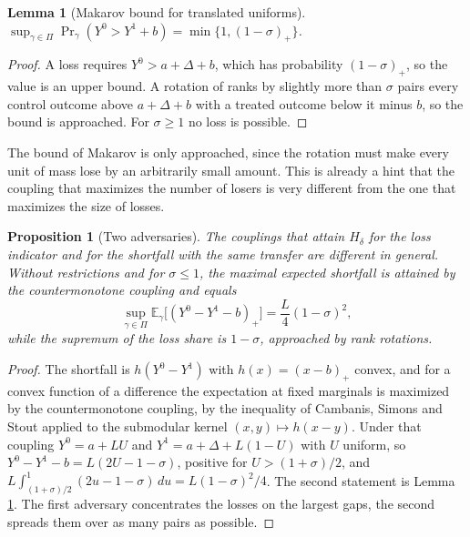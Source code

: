 \documentclass[11pt,a4paper]{article}
\theoremstyle{notesplain}
\newtheorem{proposition}[theorem]{Proposition}
\newtheorem{lemma}[theorem]{Lemma}
\theoremstyle{notesupright}
\numberwithin{equation}{section}
\newcommand{\E}{\mathbb{E}}
\begin{document}
\begin{lemma}[Makarov bound for translated uniforms]
\label{lem:makarov}
$\sup_{\gamma\in\Pi}\Pr_\gamma(Y^0>Y^1+b)=\min\{1,(1-\sigma)_+\}$.
\end{lemma}

\begin{proof}
A loss requires $Y^0>a+\Delta+b$, which has probability $(1-\sigma)_+$, so the value is an upper bound. A rotation of ranks by slightly more than $\sigma$ pairs every control outcome above $a+\Delta+b$ with a treated outcome below it minus $b$, so the bound is approached. For $\sigma\ge1$ no loss is possible.
\end{proof}

The bound of Makarov \cite{makarov} is only approached, since the rotation must make every unit of mass lose by an arbitrarily small amount. This is already a hint that the coupling that maximizes the number of losers is very different from the one that maximizes the size of losses.

\begin{proposition}[Two adversaries]
\label{prop:adversaries}
The couplings that attain $H_\delta$ for the loss indicator and for the shortfall with the same transfer are different in general. Without restrictions and for $\sigma\le1$, the maximal expected shortfall is attained by the countermonotone coupling and equals
\begin{equation}
\sup_{\gamma\in\Pi}\E_\gamma\big[(Y^0-Y^1-b)_+\big]=\frac L4(1-\sigma)^2,
\label{eq:shortfall}
\end{equation}
while the supremum of the loss share is $1-\sigma$, approached by rank rotations.
\end{proposition}

\begin{proof}
The shortfall is $h(Y^0-Y^1)$ with $h(x)=(x-b)_+$ convex, and for a convex function of a difference the expectation at fixed marginals is maximized by the countermonotone coupling, by the inequality of Cambanis, Simons and Stout \cite{cambanis} applied to the submodular kernel $(x,y)\mapsto h(x-y)$. Under that coupling $Y^0=a+LU$ and $Y^1=a+\Delta+L(1-U)$ with $U$ uniform, so $Y^0-Y^1-b=L(2U-1-\sigma)$, positive for $U>(1+\sigma)/2$, and $L\int_{(1+\sigma)/2}^1(2u-1-\sigma)\,du=L(1-\sigma)^2/4$. The second statement is Lemma \ref{lem:makarov}. The first adversary concentrates the losses on the largest gaps, the second spreads them over as many pairs as possible.
\end{proof}
\end{document}
